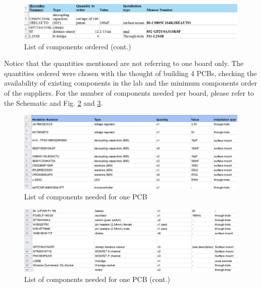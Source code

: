 \begin{figure}[htb]
    \centering
    \includegraphics[width=1\textwidth]{figures/hardware/Components2.PNG}
    \caption{List of components ordered (cont.)}
    \label{fig:compMou}
\end{figure}
\FloatBarrier

Notice that the quantities mentioned are not referring to one board only. The quantities ordered were chosen with the thought of building 4 PCBs, checking the availability of existing components in the lab and the minimum components order of the suppliers. 
For the number of components needed per board, please refer to the Schematic and Fig. \ref{fig:comp1} and \ref{fig:comp2}.

\begin{figure}[htb]
    \centering
    \includegraphics[width=1\textwidth]{figures/hardware/CompList.PNG}
    \caption{List of components needed for one PCB}
    \label{fig:comp1}
\end{figure}


\begin{figure}[htb]
    \centering
    \includegraphics[width=1\textwidth]{figures/hardware/CompList2.PNG}
    \caption{List of components needed for one PCB (cont.)}
    \label{fig:comp2}
\end{figure}
\FloatBarrier

\vspace{1cm}


